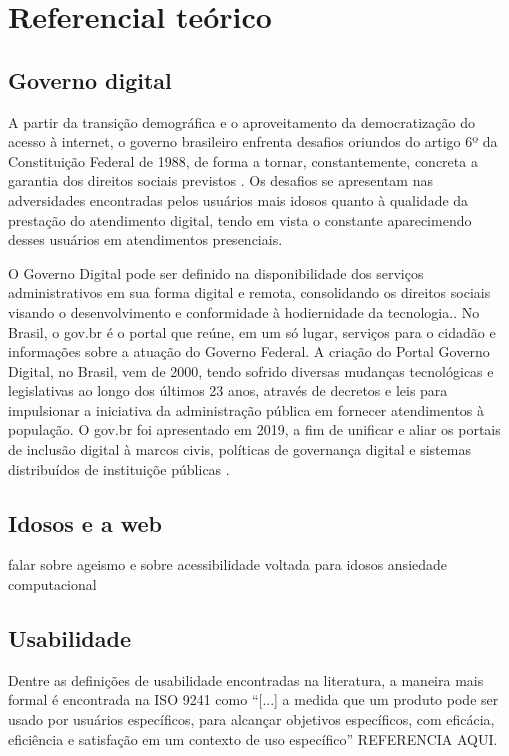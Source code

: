 \chapter[Referencial teórico]{Referencial teórico}

\section{Governo digital}
A partir da transição demográfica e o aproveitamento da democratização do acesso à internet, o governo brasileiro enfrenta desafios oriundos do artigo 6º da Constituição Federal de 1988, de forma a tornar, constantemente, concreta a garantia dos direitos sociais previstos \cite{cristovam_governo_2020}.
Os desafios se apresentam nas adversidades encontradas pelos usuários mais idosos quanto à qualidade da prestação do atendimento digital, tendo em vista o constante aparecimendo desses usuários em atendimentos presenciais.

O Governo Digital pode ser definido na disponibilidade dos serviços administrativos em sua forma digital e remota, consolidando os direitos sociais visando o desenvolvimento e conformidade à hodiernidade da tecnologia.\cite{cristovam_governo_2020}. 
No Brasil, o gov.br é o portal que reúne, em um só lugar, serviços para o cidadão e informações sobre a atuação do Governo Federal. A criação do Portal Governo Digital, no Brasil, vem de 2000, tendo sofrido diversas mudanças tecnológicas e legislativas ao longo dos últimos 23 anos, através de decretos e leis para impulsionar a iniciativa da administração pública em fornecer atendimentos à população. O gov.br foi apresentado em 2019, a fim de unificar e aliar os portais de inclusão digital à marcos civis, políticas de governança digital e sistemas distribuídos de instituiçõe públicas \cite{govbr_2023}.


\section{Idosos e a web}
falar sobre ageismo e sobre acessibilidade voltada para idosos
ansiedade computacional

\section{Usabilidade}
Dentre as definições de usabilidade encontradas na literatura, a maneira mais formal é encontrada na ISO 9241 como “[...] a medida que um produto pode ser usado por usuários específicos, para alcançar objetivos específicos, com eficácia, eficiência e satisfação em um contexto de uso específico” REFERENCIA AQUI. 

